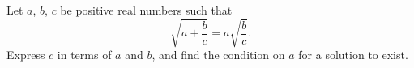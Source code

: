 Let $a$, $b$, $c$ be positive real numbers such that
\[
\sqrt{a+\dfrac {b}{c}}=a\sqrt{\dfrac {b}{c}}.
\]
Express $c$ in terms of $a$ and $b$, and find the condition on $a$ for a solution to exist.

